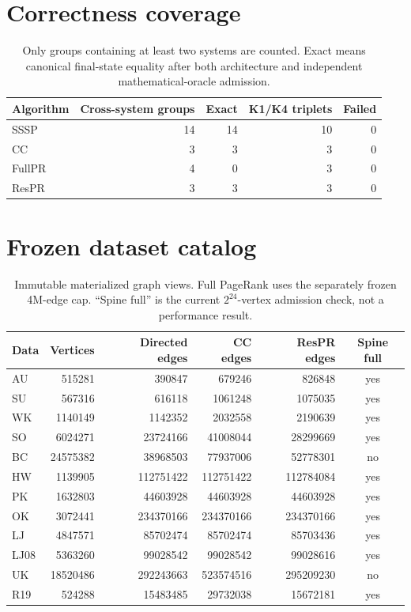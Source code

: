 \documentclass[10pt]{article}
\begin{document}
\section{Correctness coverage}
\begin{table}[ht]
\centering
\begin{tabular}{lrrrr}
\toprule
Algorithm & Cross-system groups & Exact & K1/K4 triplets & Failed \\
\midrule
    SSSP & 14 & 14 & 10 & 0 \\
    CC & 3 & 3 & 3 & 0 \\
    FullPR & 4 & 0 & 3 & 0 \\
    ResPR & 3 & 3 & 3 & 0 \\
\bottomrule
\end{tabular}
\caption{Only groups containing at least two systems are counted. Exact means
canonical final-state equality after both architecture and independent
mathematical-oracle admission.}
\end{table}

\section{Frozen dataset catalog}
\begin{table}[ht]
\centering
\small
\begin{tabular}{lrrrrc}
\toprule
Data & Vertices & Directed edges & CC edges & ResPR edges & Spine full \\
\midrule
    AU & 515281 & 390847 & 679246 & 826848 & yes \\
    SU & 567316 & 616118 & 1061248 & 1075035 & yes \\
    WK & 1140149 & 1142352 & 2032558 & 2190639 & yes \\
    SO & 6024271 & 23724166 & 41008044 & 28299669 & yes \\
    BC & 24575382 & 38968503 & 77937006 & 52778301 & no \\
    HW & 1139905 & 112751422 & 112751422 & 112784084 & yes \\
    PK & 1632803 & 44603928 & 44603928 & 44603928 & yes \\
    OK & 3072441 & 234370166 & 234370166 & 234370166 & yes \\
    LJ & 4847571 & 85702474 & 85702474 & 85703436 & yes \\
    LJ08 & 5363260 & 99028542 & 99028542 & 99028616 & yes \\
    UK & 18520486 & 292243663 & 523574516 & 295209230 & no \\
    R19 & 524288 & 15483485 & 29732038 & 15672181 & yes \\
\bottomrule
\end{tabular}
\caption{Immutable materialized graph views. Full PageRank uses the separately
frozen 4M-edge cap. ``Spine full'' is the current $2^{24}$-vertex admission
check, not a performance result.}
\end{table}
\end{document}
